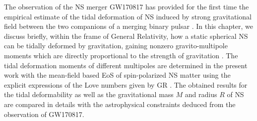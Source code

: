 The observation of the NS merger GW170817 has provided for the first time the empirical
estimate of the tidal deformation of NS induced by strong gravitational field between 
the two companions of a merging binary pulsar \citep{hinderer2008tidal,hinderer2010tidal}. In this chapter, 
we discuss briefly, within the frame of General Relativity, how a static spherical NS can be
tidally deformed by gravitation, gaining nonzero gravito-multipole moments which are
directly proportional to the strength of gravitation \citep{damour2009relativistic}.
The tidal deformation moments of different multipoles are determined in the present work 
with the mean-field based EoS of spin-polarized NS matter using the explicit expressions 
of the Love numbers given by GR \citep{perot2021role}. The obtained results for the tidal
deformability as well as the gravitational mass $M$ and radius $R$ of \gls{NS} are 
compared in details with the astrophysical constraints deduced from the observation 
of GW170817.

